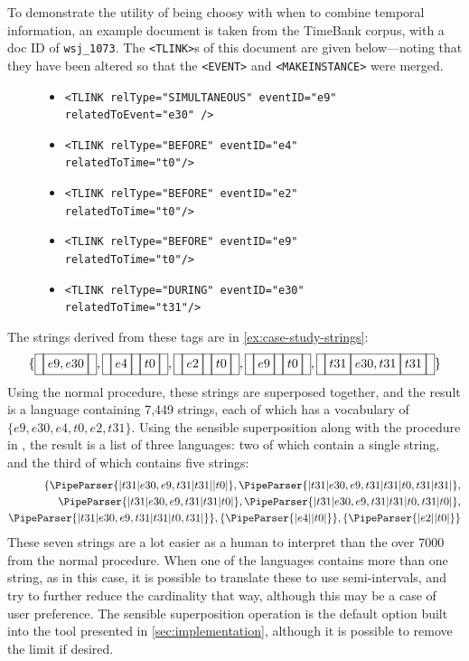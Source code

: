 \documentclass[a4paper,12pt,leqno]{article}
\newcommand{\vph}[1]{\vphantom{#1}}
\newcommand{\ebox}[1]{\fbox{$\vph{'(),}#1$}}
\newcommand{\nbBefore}[2]{\ebox{#1}\ebox{}\ebox{#2}}
\newcommand{\nbDuring}[2]{\ebox{#2}\ebox{#1,#2}\ebox{#2}}
\newcommand{\nbEquals}[2]{\ebox{#1,#2}}
\newcommand{\Before}[2]{\ebox{}\nbBefore{#1}{#2}\ebox{}}
\newcommand{\During}[2]{\ebox{}\nbDuring{#1}{#2}\ebox{}}
\newcommand{\Equals}[2]{\ebox{}\nbEquals{#1}{#2}\ebox{}}
\newcommand{\EventString}[1]{%
	\renewcommand*{\do}[1]{\ebox{##1}}%
	\PipeParser{#1}%
}
\begin{document}
To demonstrate the utility of being choosy with when to combine temporal information, an example document is taken from the TimeBank corpus, with a doc ID of \verb|wsj_1073|. The \verb|<TLINK>|s of this document are given below---noting that they have been altered so that the \verb|<EVENT>| and \verb|<MAKEINSTANCE>| were merged.
\begin{center}
	\begin{figure}[h!]
		\begin{itemize}
			\item[] \verb|<TLINK relType="SIMULTANEOUS" eventID="e9" relatedToEvent="e30" />|
			\item[] \verb|<TLINK relType="BEFORE" eventID="e4" relatedToTime="t0"/>|
			\item[] \verb|<TLINK relType="BEFORE" eventID="e2" relatedToTime="t0"/>|
			\item[] \verb|<TLINK relType="BEFORE" eventID="e9" relatedToTime="t0"/>|
			\item[] \verb|<TLINK relType="DURING" eventID="e30" relatedToTime="t31"/>|
		\end{itemize}
	\end{figure}
	\label{fig:case-study-tlinks}
\end{center}
The strings derived from these tags are in \cref{ex:case-study-strings}:
\begin{align}
	\{\Equals{e9}{e30}, \Before{e4}{t0}, \Before{e2}{t0}, \Before{e9}{t0}, \During{e30}{t31}\}\label{ex:case-study-strings}
\end{align}
Using the normal procedure, these strings are superposed together, and the result is a language containing 7,449 strings, each of which has a vocabulary of $\{e9,e30,e4,t0,e2,t31\}$. Using the sensible superposition along with the procedure in , the result is a list of three languages: two of which contain a single string, and the third of which contains five strings:
\begin{align}
	\{\EventString{{}|t31|e30,e9,t31|t31|{}|t0|{}}, \EventString{{}|t31|e30,e9,t31|t31|t0,t31|t31|{}},\label{ex:sp-sens-result}\\
	\EventString{{}|t31|e30,e9,t31|t31|t0|{}}, \EventString{{}|t31|e30,e9,t31|t31|t0,t31|t0|{}},\notag\\
	\EventString{{}|t31|e30,e9,t31|t31|t0,t31|{}}\}, \{\EventString{{}|e4|{}|t0|{}}\}, \{\EventString{{}|e2|{}|t0|{}}\}\notag
\end{align}
These seven strings are a lot easier as a human to interpret than the over 7000 from the normal procedure. When one of the languages contains more than one string, as in this case, it is possible to translate these to use semi-intervals, and try to further reduce the cardinality that way, although this may be a case of user preference. The sensible superposition operation is the default option built into the tool presented in \cref{sec:implementation}, although it is possible to remove the limit if desired.
\end{document}

